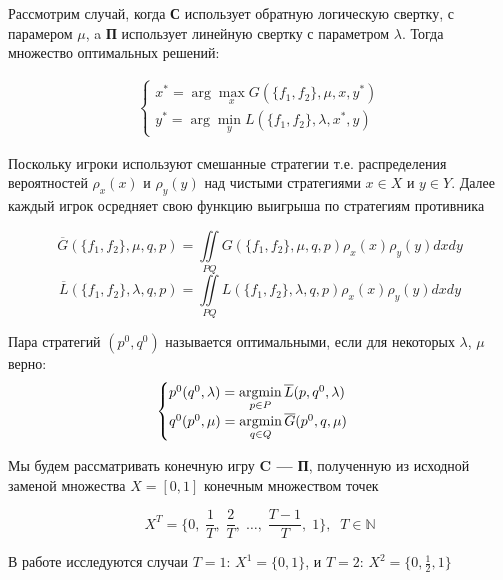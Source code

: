Рассмотрим случай, когда \textbf{С} использует обратную логическую свертку,
с парамером $\mu$, a \textbf{П} использует линейную
свертку с параметром $\lambda$. Тогда множество оптимальных решений:

\begin{gather*}
	\begin{cases}
		x^*=\arg \max \limits_{x}   G(\{f_1, f_2\}, \mu, x, y^*) \\
		y^*=\arg \min \limits_{y}   L(\{f_1, f_2\}, \lambda, x^*, y)
	\end{cases}
\end{gather*}

Поскольку игроки используют смешанные стратегии т.е. распределения вероятностей
$\rho_x(x)$ и $\rho_y(y)$ над чистыми стратегиями $x \in X$ и $y \in Y$. 
Далее каждый игрок осредняет свою функцию выигрыша по стратегиям противника

$$ \overline G(\{f_1, f_2\}, \mu, q, p) = 
\iint \limits_{PQ} G(\{f_1, f_2\}, \mu, q, p) \rho_x(x) \rho_y(y)dxdy$$
$$ \overline L(\{f_1, f_2\}, \lambda, q, p) = 
\iint \limits_{PQ} L(\{f_1, f_2\}, \lambda, q, p) \rho_x(x) \rho_y(y)dxdy$$

\begin{Def}	\label{def:optimal_strategy}
	Пара стратегий $(p^0, q^0)$ называется оптимальными, если для некоторых 
	$\lambda$, $\mu$ верно:
	\begin{equation}
		\begin{cases} 
		p^0(q^0, \lambda) = \operatorname*{argmin}\limits_{p \in P} \overline L(p, q^0, \lambda) \\ 
		q^0(p^0, \mu) = \operatorname*{argmin}\limits_{q \in Q} \overline G(p^0, q, \mu) \\
	\end{cases}
	\end{equation}
\end{Def}

Мы будем рассматривать конечную игру \textbf{C --- П}, полученную из исходной 
заменой множества $X=[0,1]$ конечным множеством точек

$$X^T = \{
	0, \; \frac{1}{T}, \; \frac{2}{T}, \; \ldots, \; \frac{T-1}{T}, \; 1
\}, \;\; T \in \mathbb{N}$$

В работе исследуются случаи $T=1$: $X^1=\{0, 1\}$, 
и $T=2$: $X^2=\{0, \frac{1}{2} ,1\}$